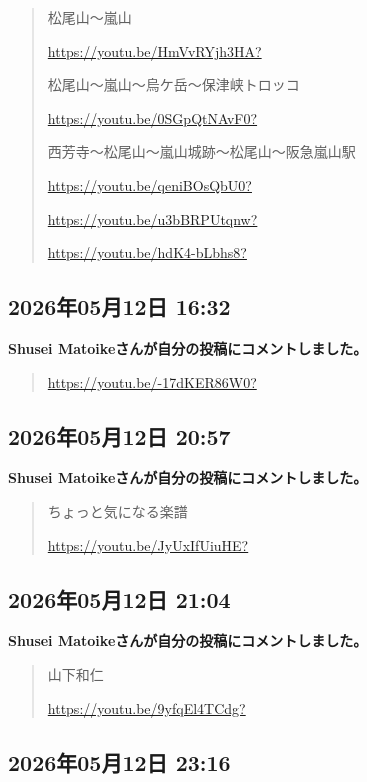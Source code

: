 \begin{quote}
松尾山〜嵐山

\url{https://youtu.be/HmVvRYjh3HA?}

松尾山〜嵐山〜烏ケ岳〜保津峡トロッコ

\url{https://youtu.be/0SGpQtNAvF0?}

西芳寺〜松尾山〜嵐山城跡〜松尾山〜阪急嵐山駅

\url{https://youtu.be/qeniBOsQbU0?}

\url{https://youtu.be/u3bBRPUtqnw?}

\url{https://youtu.be/hdK4-bLbhs8?}
\end{quote}

\subsection*{2026年05月12日 16:32}

\textbf{Shusei Matoikeさんが自分の投稿にコメントしました。}

\begin{quote}
\url{https://youtu.be/-17dKER86W0?}
\end{quote}

\subsection*{2026年05月12日 20:57}

\textbf{Shusei Matoikeさんが自分の投稿にコメントしました。}

\begin{quote}
ちょっと気になる楽譜

\url{https://youtu.be/JyUxIfUiuHE?}
\end{quote}

\subsection*{2026年05月12日 21:04}

\textbf{Shusei Matoikeさんが自分の投稿にコメントしました。}

\begin{quote}
山下和仁

\url{https://youtu.be/9yfqEl4TCdg?}
\end{quote}

\subsection*{2026年05月12日 23:16}

